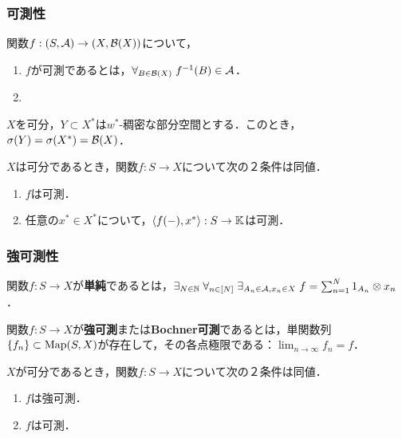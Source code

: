 \documentclass[uplatex,dvipdfmx]{jsreport}
\begin{document}
\subsubsection{可測性}

\begin{definition}[measurable]
    関数$f:(S,\mathcal{A})\to (X,\mathcal{B}(X))$について，
    \begin{enumerate}
        \item $f$が可測であるとは，$\forall_{B\in\mathcal{B}(X)}\;f^{-1}(B)\in\mathcal{A}$．
        \item 
    \end{enumerate}
\end{definition}

\begin{proposition}[可分ならば縮退する]
    $X$を可分，$Y\subset X^*$は$w^*$-稠密な部分空間とする．このとき，$\sigma(Y)=\sigma(X^*)=\mathcal{B}(X)$．
\end{proposition}

\begin{corollary}[可測性の特徴付け]
    $X$は可分であるとき，関数$f:S\to X$について次の２条件は同値．
    \begin{enumerate}
        \item $f$は可測．
        \item 任意の$x^*\in X^*$について，$\langle f(-),x^*\rangle:S\to\mathbb{K}$は可測．
    \end{enumerate}
\end{corollary}

\subsubsection{強可測性}

\begin{definition}[simple]
    関数$f:S\to X$が\textbf{単純}であるとは，$\exists_{N\in\mathbb{N}}\;\forall_{n\in[N]}\;\exists_{A_n\in\mathcal{A},x_n\in X}\;f=\sum_{n=1}^N1_{A_n}\otimes x_n$．
\end{definition}

\begin{definition}
    関数$f:S\to X$が\textbf{強可測}または\textbf{Bochner可測}であるとは，単関数列$\{f_n\}\subset\mathrm{Map}(S,X)$が存在して，その各点極限である：$\lim_{n\to\infty}f_n=f$．
\end{definition}

\begin{lemma}
    $X$が可分であるとき，関数$f:S\to X$について次の２条件は同値．
    \begin{enumerate}
        \item $f$は強可測．
        \item $f$は可測．
    \end{enumerate}
\end{lemma}
\end{document}
